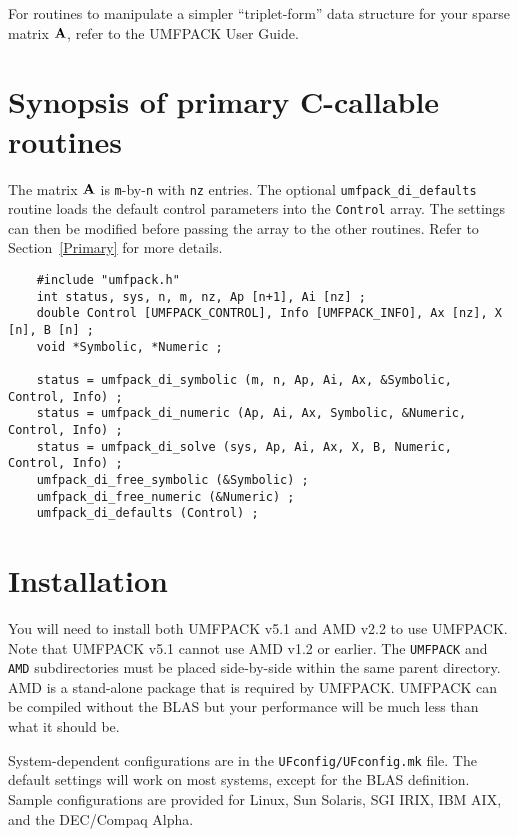 \documentclass[11pt]{article}
\newcommand{\m}[1]{{\bf{#1}}}       %
\begin{document}
For routines to manipulate a simpler ``triplet-form'' data structure for your
sparse matrix $\m{A}$, refer to the UMFPACK User Guide.

\section{Synopsis of primary C-callable routines}
\label{Synopsis}

The matrix $\m{A}$ is {\tt m}-by-{\tt n} with {\tt nz} entries.
The optional {\tt umfpack\_di\_defaults} routine loads the default control
parameters into the {\tt Control} array.  The settings can then be modified
before passing the array to the other routines.  Refer to Section~\ref{Primary}
for more details.

{\footnotesize
\begin{verbatim}
    #include "umfpack.h"
    int status, sys, n, m, nz, Ap [n+1], Ai [nz] ;
    double Control [UMFPACK_CONTROL], Info [UMFPACK_INFO], Ax [nz], X [n], B [n] ;
    void *Symbolic, *Numeric ;

    status = umfpack_di_symbolic (m, n, Ap, Ai, Ax, &Symbolic, Control, Info) ;
    status = umfpack_di_numeric (Ap, Ai, Ax, Symbolic, &Numeric, Control, Info) ;
    status = umfpack_di_solve (sys, Ap, Ai, Ax, X, B, Numeric, Control, Info) ;
    umfpack_di_free_symbolic (&Symbolic) ;
    umfpack_di_free_numeric (&Numeric) ;
    umfpack_di_defaults (Control) ;
\end{verbatim}
}

\section{Installation}
\label{Install}

You will need to install both UMFPACK v5.1 and AMD v2.2 to use UMFPACK.
Note that UMFPACK v5.1 cannot use AMD v1.2 or earlier.
The {\tt UMFPACK} and {\tt AMD} subdirectories must be placed side-by-side
within the same parent directory.  AMD is a stand-alone package that
is required by UMFPACK.  UMFPACK can be compiled without the
BLAS but your performance will be much less than what it should be.

System-dependent configurations are in the {\tt UFconfig/UFconfig.mk}
file.  The default
settings will work on most systems, except for the BLAS definition.
Sample configurations are provided
for Linux, Sun Solaris, SGI IRIX, IBM AIX, and the DEC/Compaq Alpha.
\end{document}
